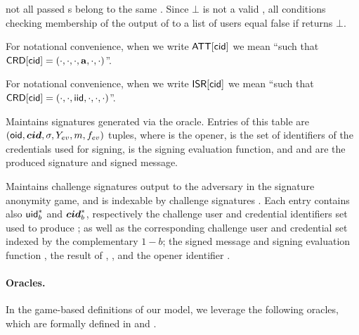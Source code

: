 \begin{description}
  not all passed {\cid}s belong to the same \uid. Since $\bot$ is not a valid
  \uid, all conditions checking membership of the output of \OWNR to a list of
  users equal false if \OWNR returns $\bot$.
\item[\ATTR.] For notational convenience, when we write $\mathsf{ATT}[\mathsf{cid}]$ we mean
  ``\attrs such that $\mathsf{CRD}[\mathsf{cid}] = (\cdot,\cdot,\cdot,\mathbf{a},\cdot,\cdot)$''.
\item[\ISR.] For notational convenience, when we write $\mathsf{ISR}[\mathsf{cid}]$ we mean
  ``\iid such that $\mathsf{CRD}[\mathsf{cid}] = (\cdot,\cdot,\mathsf{iid},\cdot,\cdot,\cdot)$''.
\item[\SIG.] Maintains signatures generated via the \SIGN oracle. Entries of
  this table are $(\mathsf{oid},\boldsymbol{cid},\sigma,Y_{ev},m,f_{ev})$ tuples, where \oid is
  the opener, \scid is the set of identifiers of the credentials used for
  signing, \feval is the signing evaluation function, and \sig and \msg are the
  produced signature and signed message.
\item[\CSIG.] Maintains challenge signatures output to the adversary in the
  signature anonymity game, and is indexable by challenge signatures \csig.
  Each entry contains also $\mathsf{uid}^*_b$ and $\boldsymbol{cid}^*_b$, respectively the challenge
  user  and credential identifiers set used to produce \csig; as well as the
  corresponding challenge user and credential set indexed by the complementary
  $1-b$; the signed message \msg and signing evaluation function \feval, the
  result of \feval, \Yeval, and the opener identifier \oid.
\end{description}

\paragraph{Oracles.} %
In the game-based definitions of our \UAS model, we leverage the following
oracles, which are formally defined in  and
. 

